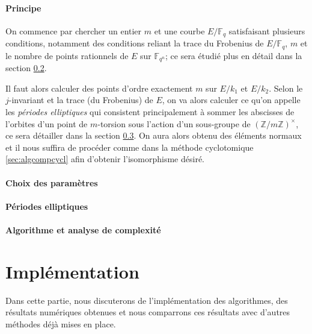 \documentclass[a4paper]{article} %
\numberwithin{section}{part}
\numberwithin{equation}{section}
\newcommand\zmodninv[1]{(\mathbb{Z}/#1\mathbb{Z})^{\times}}
\newcommand\GF[1]{\mathbb{F}_{#1}}
\begin{document}
\subsection{Principe}
On commence par chercher un entier $m$ et une courbe $E/\GF{q}$ satisfaisant
plusieurs conditions, notamment des conditions reliant la trace du Frobenius de
$E/\GF{q}$, $m$ et le nombre de points rationnels de $E$ sur $\GF{q^n}$; ce sera
étudié plus en détail dans la section \ref{sec:choixparam}.\par
Il faut alors calculer des points d'ordre exactement $m$ sur $E/k_1$ et $E/k_2$.
Selon le $j$-invariant et la trace (du Frobenius) de $E$, on va alors calculer
ce qu'on appelle les \emph{périodes elliptiques} qui consistent principalement à
sommer les abscisses de l'orbites d'un point de $m$-torsion sous l'action d'un
sous-groupe de $\zmodninv{m}$, ce sera détailler dans la section
\ref{sec:perell}. On aura alors obtenu des éléments normaux et il nous suffira 
de procéder comme dans la méthode cyclotomique \ref{sec:algcompcycl} afin
d'obtenir l'isomorphisme désiré.

\subsection{Choix des paramètres}
\label{sec:choixparam}

\subsection{Périodes elliptiques}
\label{sec:perell}

\subsection{Algorithme et analyse de complexité}

\part{Implémentation}
\label{trois}
Dans cette partie, nous discuterons de l'implémentation des algorithmes, des
résultats numériques obtenues et nous comparrons ces résultats avec d'autres
méthodes déjà mises en place. 
\end{document}
